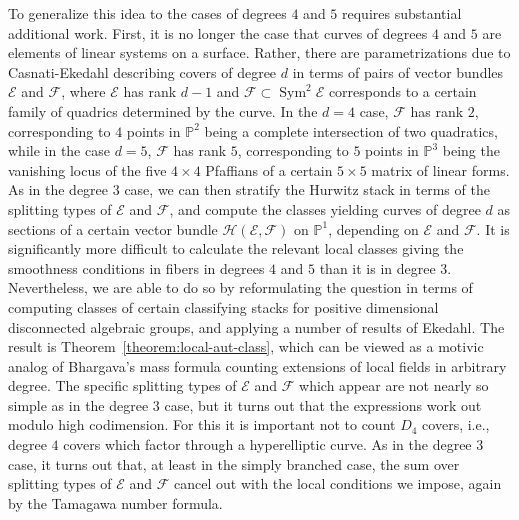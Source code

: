 \documentclass[12 pt]{amsart}
\theoremstyle{plain}
\theoremstyle{definition}
\theoremstyle{remark}
\numberwithin{equation}{section}
\newcommand\bp{\mathbb P}
\newcommand\sce{\mathscr E}
\newcommand\scf{\mathscr F}
\newcommand\sch{\mathscr H}
\DeclareMathOperator\sym{Sym}
\begin{document}
To generalize this idea to the cases of degrees $4$ and $5$ requires substantial
additional work. First, it is no longer the case that curves of degrees $4$ and
$5$ are elements of linear systems on a surface. Rather, there are
parametrizations due to Casnati-Ekedahl \cite{casnatiE:covers-algebraic-varieties,casnati:covers-algebraic-varieties-ii} describing covers of degree
$d$ in terms of pairs of vector bundles $\sce$ and $\scf$, where
$\sce$ has rank $d - 1$ and $\scf \subset \sym^2 \sce$ corresponds to a certain
family of quadrics determined by the curve. In the $d = 4$ case, $\scf$ has
rank $2$, corresponding to $4$ points in $\bp^2$ being a complete intersection of
two quadratics, while in the case $d = 5$, $\scf$ has rank $5$, corresponding to
$5$ points in $\bp^3$ being the vanishing locus of the five $4 \times 4$
Pfaffians of a certain $5 \times 5$ matrix of linear forms.
As in the degree $3$ case, we can then stratify the Hurwitz stack in terms of
the splitting types of $\sce$ and $\scf$, and compute the classes yielding
curves of degree $d$ as sections of a certain vector bundle $\sch(\sce, \scf)$ on $\bp^1$,
depending on $\sce$ and $\scf$.
It is significantly more difficult to calculate the relevant local classes
giving the smoothness conditions in fibers in degrees $4$ and $5$ than it is in
degree $3$.
Nevertheless, we are able to do so by reformulating the question in terms of computing
classes of certain classifying stacks for positive dimensional disconnected
algebraic groups, and applying a number of results of Ekedahl.
The result is Theorem~\ref{theorem:local-aut-class}, which can be viewed as a motivic analog of Bhargava's mass formula \cite{Bhargava2010} counting extensions of local fields in arbitrary degree. 
The specific splitting types of $\sce$ and $\scf$ which appear are not nearly so
simple as in the degree $3$ case, but it turns out that the expressions work out
modulo high codimension. 
For this it is important not to count $D_4$ covers, i.e., degree
$4$ covers which factor through a hyperelliptic curve. 
As in the degree $3$ case, it turns out that, at least in the simply branched case, the sum
over splitting types of $\sce$ and $\scf$ cancel out with the local conditions
we impose, again by the Tamagawa number formula.
\end{document}
